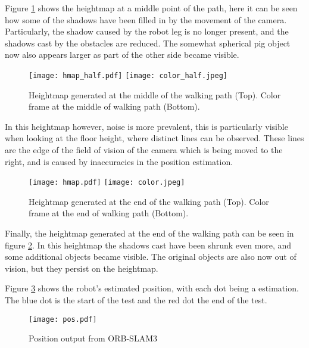         \newpage
        \noindent
        Figure \ref{fig:hardware_hmap_mid} shows the heightmap at a middle point of the path, here it can be seen how some of the shadows have been
        filled in by the movement of the camera. Particularly, the shadow caused by the robot leg is no longer present, and the shadows cast by the
        obstacles are reduced. The somewhat spherical pig object now also appears larger as part of the other side became visible.
        \begin{figure}[h]
            \centering
            \texttt{[image: hmap\_half.pdf]}
            \texttt{[image: color\_half.jpeg]}
            \caption{Heightmap generated at the middle of the walking path (Top). Color frame at the middle of walking path (Bottom).}
            \label{fig:hardware_hmap_mid}
        \end{figure}

        \noindent
        In this heightmap however, noise is more prevalent, this is particularly visible when looking at the floor height, where distinct lines can be observed.
        These lines are the edge of the field of vision of the camera which is being moved to the right, and is caused by inaccuracies in the position estimation.

        \begin{figure}[h]
            \centering
            \texttt{[image: hmap.pdf]}
            \texttt{[image: color.jpeg]}
            \caption{Heightmap generated at the end of the walking path (Top). Color frame at the end of walking path (Bottom).}
            \label{fig:hardware_hmap}
        \end{figure}

        \noindent
        Finally, the heightmap generated at the end of the walking path can be seen in figure \ref{fig:hardware_hmap}. In this heightmap the shadows cast
        have been shrunk even more, and some additional objects became visible. The original objects are also now out of vision, but they persist on the heightmap. 

        Figure \ref{fig:hardware_pos} shows the robot's estimated position, with each dot being a estimation. The blue dot is the start of the test and the red dot the end of the test.
        \begin{figure}[h]
            \centering
            \texttt{[image: pos.pdf]}
            \caption{Position output from ORB-SLAM3}
            \label{fig:hardware_pos}
        \end{figure}

